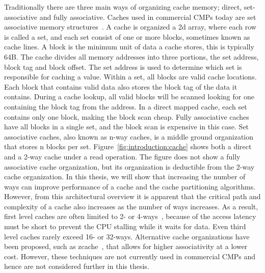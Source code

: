 Traditionally there are three main ways of organizing cache memory; direct, set-associative and fully associative.
Caches used in commercial CMPs today are set associative memory structures~\cite{Thomadakis2011, Jain2013, ARM2010, Ho2014}.
A cache is organized a 2d array, where each row is called a set, and each set consist of one or more blocks, sometimes known as cache lines.
A block is the minimum unit of data a cache stores, this is typically 64B.
The cache divides all memory addresses into three portions, the set address, block tag and block offset.
The set address is used to determine which set is responsible for caching a value.
Within a set, all blocks are valid cache locations.
Each block that contains valid data also stores the block tag of the data it contains.
During a cache lookup, all valid blocks will be scanned looking for one containing the block tag from the address.
In a direct mapped cache, each set contains only one block, making the block scan cheap.
Fully associative caches have all blocks in a single set, and the block scan is expensive in this case.
Set associative caches, also known as n-way caches, is a middle ground organization that stores n blocks per set.
Figure~\ref{fig:introduction:cache} shows both a direct and a 2-way cache under a read operation.
The figure does not show a fully associative cache organization, but its organization is deductible from the 2-way cache organization.
In this thesis, we will show that increasing the number of ways can improve performance of a cache and the cache partitioning algorithms.
However, from this architectural overview it is apparent that the critical path and complexity of a cache also increases as the number of ways increases.
As a result, first level caches are often limited to 2- or 4-ways~\cite{Sanchez2010}, because of the access latency must be short to prevent the CPU stalling while it waits for data. 
Even third level caches rarely exceed 16- or 32-ways.
Alternative cache organizations have been proposed, such as zcache~\cite{Sanchez2010}, that allows for higher associativity at a lower cost.
However, these techniques are not currently used in commercial CMPs and hence are not considered further in this thesis.

